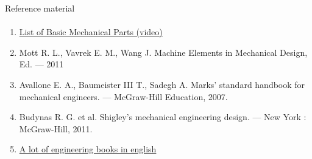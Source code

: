 \documentclass[aspectratio=169]{beamer}
\newcommand{\fbckg}[1]{\usebackgroundtemplate{\texttt{[image: \#1]}}}%
\begin{document}
\begin{frame}[t]{Reference material}
    \framesubtitle{}
    \begin{enumerate}
        \item \href{https://www.youtube.com/watch?v=e4bWFgQTlxc}{List of Basic Mechanical Parts (video)}
        \item Mott R. L., Vavrek E. M., Wang J. Machine Elements in Mechanical Design, Ed. --- 2011
        \item Avallone E. A., Baumeister III T., Sadegh A. Marks' standard handbook for mechanical engineers. --- McGraw-Hill Education, 2007.
        \item Budynas R. G. et al. Shigley's mechanical engineering design. --- New York : McGraw-Hill, 2011.
        \item \href{https://engineeringbookspdf.com/category/mechanical-engineering-pdf-books/}{A lot of engineering books in english}
    \end{enumerate}

\end{frame}



\fbckg{fibeamer/figs/last_page.png}
\frame[plain]{}
\end{document}
